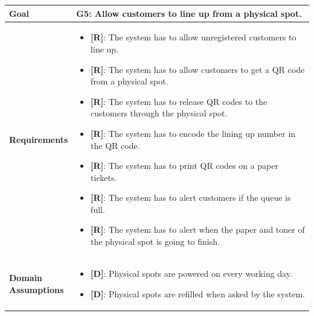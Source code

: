 \begin{table}[H]
\centering
\begin{tabular}{| m{} | m{} |} 
	\hline
	\textbf{Goal} &
		\textbf{G5: Allow customers to line up from a physical spot.} \\
	\hline
	\textbf{Requirements} &
		\begin{itemize}
			\item {\textbf{[R]}}: The system has to allow unregistered customers to line up.
			\item {\textbf{[R]}}: The system has to allow customers to get a QR code from a physical spot.
			\item {\textbf{[R]}}: The system has to release QR codes to the customers through the physical spot.
			\item {\textbf{[R]}}: The system has to encode the lining up number in the QR code.
			\item {\textbf{[R]}}: The system has to print QR codes on a paper tickets.
			\item {\textbf{[R]}}: The system has to alert customers if the queue is full.
			\item {\textbf{[R]}}: The system has to alert when the paper and toner of the physical spot is going to finish.
		\end{itemize} \\ 
	\hline
	\shortstack[l]{\textbf{Domain} \\ \textbf{Assumptions}} & 
		\begin{itemize}
			\item {\textbf{[D]}}: Physical spots are powered on every working day.
			\item {\textbf{[D]}}: Physical spots are refilled when asked by the system. 
		\end{itemize} \\ 
	\hline
\end{tabular}
\end{table}

